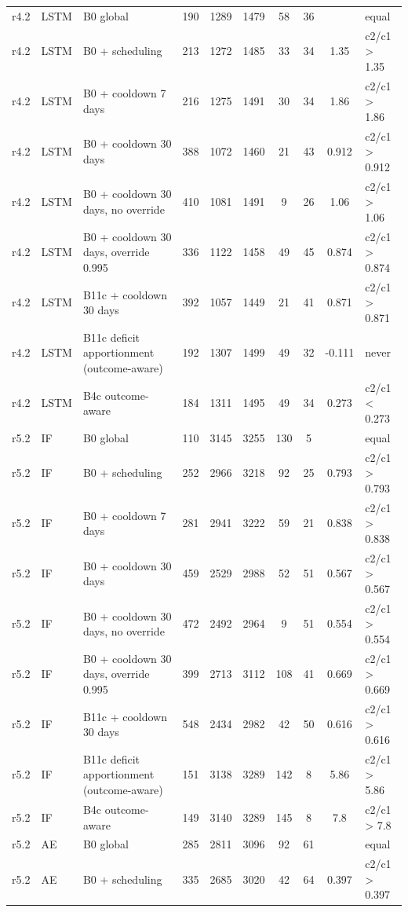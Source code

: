 \begin{longtable}{llp{4.6cm}ccccccl}
r4.2 & LSTM & B0 global & 190 & 1289 & 1479 & 58 & 36 &  & equal \\
r4.2 & LSTM & B0 + scheduling & 213 & 1272 & 1485 & 33 & 34 & 1.35 & c2/c1 > 1.35 \\
r4.2 & LSTM & B0 + cooldown 7 days & 216 & 1275 & 1491 & 30 & 34 & 1.86 & c2/c1 > 1.86 \\
r4.2 & LSTM & B0 + cooldown 30 days & 388 & 1072 & 1460 & 21 & 43 & 0.912 & c2/c1 > 0.912 \\
r4.2 & LSTM & B0 + cooldown 30 days, no override & 410 & 1081 & 1491 & 9 & 26 & 1.06 & c2/c1 > 1.06 \\
r4.2 & LSTM & B0 + cooldown 30 days, override 0.995 & 336 & 1122 & 1458 & 49 & 45 & 0.874 & c2/c1 > 0.874 \\
r4.2 & LSTM & B11c + cooldown 30 days & 392 & 1057 & 1449 & 21 & 41 & 0.871 & c2/c1 > 0.871 \\
r4.2 & LSTM & B11c deficit apportionment (outcome-aware) & 192 & 1307 & 1499 & 49 & 32 & -0.111 & never \\
r4.2 & LSTM & B4c outcome-aware & 184 & 1311 & 1495 & 49 & 34 & 0.273 & c2/c1 < 0.273 \\
r5.2 & IF & B0 global & 110 & 3145 & 3255 & 130 & 5 &  & equal \\
r5.2 & IF & B0 + scheduling & 252 & 2966 & 3218 & 92 & 25 & 0.793 & c2/c1 > 0.793 \\
r5.2 & IF & B0 + cooldown 7 days & 281 & 2941 & 3222 & 59 & 21 & 0.838 & c2/c1 > 0.838 \\
r5.2 & IF & B0 + cooldown 30 days & 459 & 2529 & 2988 & 52 & 51 & 0.567 & c2/c1 > 0.567 \\
r5.2 & IF & B0 + cooldown 30 days, no override & 472 & 2492 & 2964 & 9 & 51 & 0.554 & c2/c1 > 0.554 \\
r5.2 & IF & B0 + cooldown 30 days, override 0.995 & 399 & 2713 & 3112 & 108 & 41 & 0.669 & c2/c1 > 0.669 \\
r5.2 & IF & B11c + cooldown 30 days & 548 & 2434 & 2982 & 42 & 50 & 0.616 & c2/c1 > 0.616 \\
r5.2 & IF & B11c deficit apportionment (outcome-aware) & 151 & 3138 & 3289 & 142 & 8 & 5.86 & c2/c1 > 5.86 \\
r5.2 & IF & B4c outcome-aware & 149 & 3140 & 3289 & 145 & 8 & 7.8 & c2/c1 > 7.8 \\
r5.2 & AE & B0 global & 285 & 2811 & 3096 & 92 & 61 &  & equal \\
r5.2 & AE & B0 + scheduling & 335 & 2685 & 3020 & 42 & 64 & 0.397 & c2/c1 > 0.397 \\

\end{longtable}
